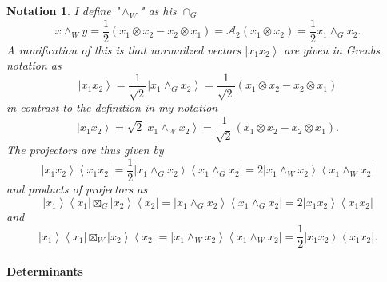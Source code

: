 \documentclass[aps,preprint]{revtex4}%
\newtheorem{notation}[theorem]{Notation}
\begin{document}
\begin{notation}
I define "$\wedge_{W}$" as his $\cap_{G}$
\begin{equation}
x\wedge_{W}y=\frac{1}{2}\left(  x_{1}\otimes x_{2}-x_{2}\otimes x_{1}\right)
=\mathcal{A}_{2}\left(  x_{1}\otimes x_{2}\right)  =\frac{1}{2}x_{1}\wedge
_{G}x_{2}.
\end{equation}
A ramification of this is that normailzed vectors $\left\vert x_{1}%
x_{2}\right\rangle $ are given in Greubs notation as
\begin{equation}
\left\vert x_{1}x_{2}\right\rangle =\frac{1}{\sqrt{2}}\left\vert x_{1}%
\wedge_{G}x_{2}\right\rangle =\frac{1}{\sqrt{2}}\left(  x_{1}\otimes
x_{2}-x_{2}\otimes x_{1}\right)
\end{equation}
in contrast to the definition in my notation
\begin{equation}
\left\vert x_{1}x_{2}\right\rangle =\sqrt{2}\left\vert x_{1}\wedge_{W}%
x_{2}\right\rangle =\frac{1}{\sqrt{2}}\left(  x_{1}\otimes x_{2}-x_{2}\otimes
x_{1}\right)  .
\end{equation}
The projectors are thus given by
\begin{equation}
\left\vert x_{1}x_{2}\right\rangle \left\langle x_{1}x_{2}\right\vert
=\frac{1}{2}\left\vert x_{1}\wedge_{G}x_{2}\right\rangle \left\langle
x_{1}\wedge_{G}x_{2}\right\vert =2\left\vert x_{1}\wedge_{W}x_{2}\right\rangle
\left\langle x_{1}\wedge_{W}x_{2}\right\vert
\end{equation}
and products of projectors as
\begin{equation}
\left\vert x_{1}\right\rangle \left\langle x_{1}\right\vert \boxtimes
_{G}\left\vert x_{2}\right\rangle \left\langle x_{2}\right\vert =\left\vert
x_{1}\wedge_{G}x_{2}\right\rangle \left\langle x_{1}\wedge_{G}x_{2}\right\vert
=2\left\vert x_{1}x_{2}\right\rangle \left\langle x_{1}x_{2}\right\vert
\end{equation}
and
\begin{equation}
\left\vert x_{1}\right\rangle \left\langle x_{1}\right\vert \boxtimes
_{W}\left\vert x_{2}\right\rangle \left\langle x_{2}\right\vert =\left\vert
x_{1}\wedge_{W}x_{2}\right\rangle \left\langle x_{1}\wedge_{W}x_{2}\right\vert
=\frac{1}{2}\left\vert x_{1}x_{2}\right\rangle \left\langle x_{1}%
x_{2}\right\vert .
\end{equation}

\end{notation}

\paragraph{Determinants}%
\end{document}
